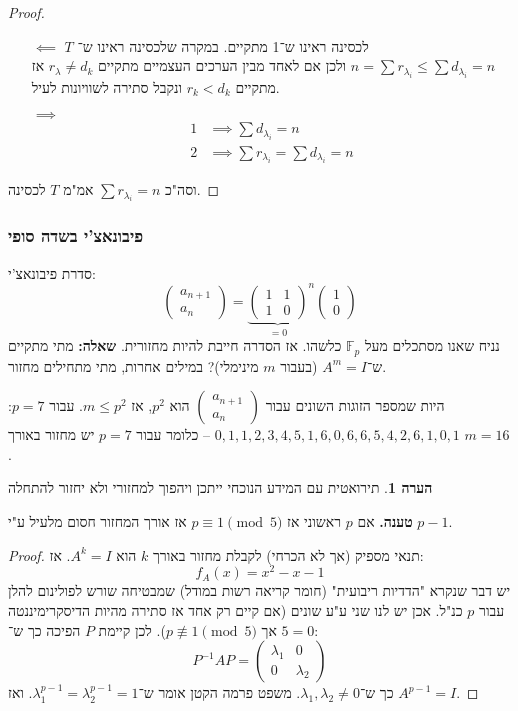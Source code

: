 \documentclass[a4paper]{article}
\newcommand\F         {\mathbb{F}}
\newcommand\pms[1]    {\begin{pmatrix}
		#1
\end{pmatrix}}
\renewcommand\lg      {\lambda}
\newcommand\op    {^{-1}}
\theoremstyle{definition}
\newtheorem{Remark}{\color{mycyan}הערה}
\newcommand\rmark [1] {\begin{Remark}#1\end{Remark}}
\begin{document}
	\begin{proof}\,
		\begin{itemize}
			\item[$\impliedby$]$T$ לכסינה ראינו ש־1 מתקיים. במקרה שלכסינה ראינו ש־$n = \sum r_{\lg_i} \le \sum d_{\lg_i} = n$ ולכן אם לאחד מבין הערכים העצמיים מתקיים $r_\lg \neq d_k$ אז מתקיים $r_k < d_k$ ונקבל סתירה לשוויונות  לעיל. 
			\item[$\implies$] 
			\begin{align*}
				1 &\implies \sum d_{\lg_i} = n \\
				2 &\implies \sum r_{\lg_i} = \sum d_{\lg_i} = n
			\end{align*}
		\end{itemize}
		וסה"כ $\sum r_{\lg_i} = n$ אמ"מ $T$ לכסינה. 
	\end{proof}
	
	\subsubsection{פיבונאצ'י בשדה סופי}
	סדרת פיבונאצ'י: 
	\[ \pms{a_{n + 1} \\ a_n} = {\underbrace{\pms{1 & 1 \\ 1 & 0}}_{ = 0}}^{n}\pms{1 \\ 0} \]
	נניח שאנו מסתכלים מעל $\F_p$ כלשהו. אז הסדרה חייבת להיות מחזורית. \textbf{שאלה: }מתי מתקיים ש־$A^m = I$ (בעבור $m$ מינימלי)? במילים אחרות, מתי מתחילים מחזור. 
	
	היות שמספר הזוגות השונים עבור $\pms{a_{n + 1} \\ a_n}$ הוא $p^2$, אז $m \le p^2$. עבור $p = 7$: \hfill $0, 1, 1, 2, 3, 4, 5, 1, 6, 0, 6, 6, 5, 4, 2, 6, 1, 0, 1$ – כלומר עבור $p = 7$ יש מחזור באורך $m = 16$.
	\rmark{תירואטית עם המידע הנוכחי ייתכן ויהפוך למחזורי ולא יחזור להתחלה}
	
	\textbf{טענה. }אם $p$ ראשוני אז $p \equiv 1 \pmod 5$ אז אורך המחזור חסום מלעיל ע"י $p - 1$. 
	
	\begin{proof}
		תנאי מספיק (אך לא הכרחי) לקבלת מחזור באורך $k$ הוא $A^k = I$. אז: 
		\[ f_A(x) = x^2 - x - 1 \]
		יש דבר שנקרא "הדדיות ריבועית" (חומר קריאה רשות במודל) שמבטיחה שורש לפולינום להלן עבור $p$ כנ"ל. אכן יש לנו שני ע"ע שונים (אם קיים רק אחד אז סתירה מהיות הדיסקרימיננטה $5 = 0$ אך $p \not\equiv 1 \pmod 5$). לכן קיימת $P$ הפיכה כך ש־: 
		\[ P\op AP = \pms{\lg_1 & 0 \\ 0 & \lg_2} \]
		כך ש־$\lg_1, \lg_2 \neq 0$. משפט פרמה הקטן אומר ש־$\lg_1^{p - 1}  = \lg_2^{p - 1} = 1$. ואז $A^{p - 1} = I$. 
	\end{proof}
	
\end{document}
